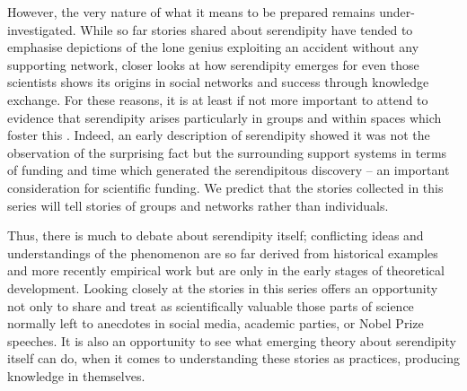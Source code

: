 \documentclass[authordate, empirical]{jote-new-article}
\begin{document}
However, the very nature of what it means to be prepared remains under-investigated. While so far stories shared about serendipity have tended to emphasise depictions of the lone genius exploiting an accident without any supporting network, closer looks at how serendipity emerges for even those scientists shows its origins in social networks and success through knowledge exchange. For these reasons, it is at least if not more important to attend to evidence that serendipity arises particularly in groups and within spaces which foster this \parencites{Darbellay2014}{McCulloch2021}. Indeed, an early description of serendipity \parencites{Barber1958} showed it was not the observation of the surprising fact but the surrounding support systems in terms of funding and time which generated the serendipitous discovery -- an important consideration for scientific funding. We predict that the stories collected in this series will tell stories of groups and networks rather than individuals.



Thus, there is much to debate about serendipity itself; conflicting ideas and understandings of the phenomenon are so far derived from historical examples and more recently empirical work but are only in the early stages of theoretical development. Looking closely at the stories in this series offers an opportunity not only to share and treat as scientifically valuable those parts of science normally left to anecdotes in social media, academic parties, or Nobel Prize speeches. It is also an opportunity to see what emerging theory about serendipity itself can do, when it comes to understanding these stories as practices, producing knowledge in themselves.





\printbibliography
\end{document}
